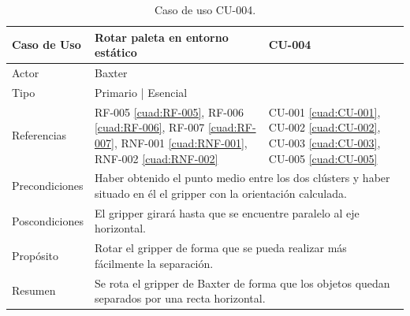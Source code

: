 \begin{table}[H]
	\centering
	\begin{tabular}{|p{2.5cm} | p{6cm} | p{5cm} |}
		\hline
		\textbf{Caso de Uso} & Rotar paleta en entorno estático & \textbf{CU-004} \\
		\hline 
		Actor & \multicolumn{2}{|l|}{Baxter} \\
		\hline
		Tipo & \multicolumn{2}{|l|}{Primario | Esencial} \\
		\hline
		Referencias & RF-005 \ref{cuad:RF-005}, RF-006 \ref{cuad:RF-006}, RF-007 \ref{cuad:RF-007}, RNF-001 \ref{cuad:RNF-001}, RNF-002 \ref{cuad:RNF-002} & CU-001 \ref{cuad:CU-001}, CU-002 \ref{cuad:CU-002}, CU-003 \ref{cuad:CU-003}, CU-005 \ref{cuad:CU-005} \\
		\hline
		Precondiciones & \multicolumn{2}{|l|}{\parbox{30em}{Haber obtenido el punto medio entre los dos clústers y haber situado en él el gripper con la orientación calculada.}} \\
		\hline
		Poscondiciones & \multicolumn{2}{|l|}{\parbox{30em}{El gripper girará hasta que se encuentre paralelo al eje horizontal.}}\\
		\hline
		Propósito & \multicolumn{2}{|l|}{\parbox{30em}{Rotar el gripper de forma que se pueda realizar más fácilmente la separación.}} \\
		\hline
		Resumen & \multicolumn{2}{|l|}{\parbox{30em}{Se rota el gripper de Baxter de forma que los objetos quedan separados por una recta horizontal.}} \\
		\hline
		
	\end{tabular}
	\caption{Caso de uso CU-004.}
	\label{cuad:CU-004}
\end{table}

